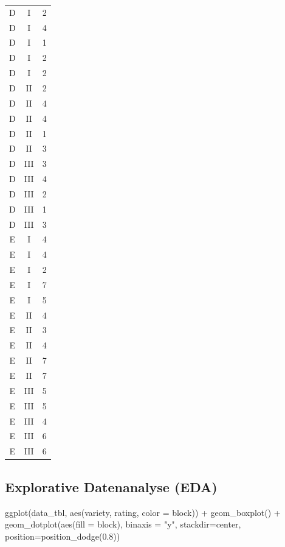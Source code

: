 \documentclass[
  letterpaper,
]{scrbook}
\newenvironment{Shaded}{\begin{snugshade}}{\end{snugshade}}
\newcommand{\AttributeTok}[1]{\textcolor[rgb]{0.40,0.45,0.13}{#1}}
\newcommand{\FloatTok}[1]{\textcolor[rgb]{0.68,0.00,0.00}{#1}}
\newcommand{\FunctionTok}[1]{\textcolor[rgb]{0.28,0.35,0.67}{#1}}
\newcommand{\NormalTok}[1]{\textcolor[rgb]{0.00,0.23,0.31}{#1}}
\newcommand{\SpecialCharTok}[1]{\textcolor[rgb]{0.37,0.37,0.37}{#1}}
\newcommand{\StringTok}[1]{\textcolor[rgb]{0.13,0.47,0.30}{#1}}
\begin{document}
\begin{longtable}[]{@{}ccc@{}}
D & I & 2 \\
D & I & 4 \\
D & I & 1 \\
D & I & 2 \\
D & I & 2 \\
D & II & 2 \\
D & II & 4 \\
D & II & 4 \\
D & II & 1 \\
D & II & 3 \\
D & III & 3 \\
D & III & 4 \\
D & III & 2 \\
D & III & 1 \\
D & III & 3 \\
E & I & 4 \\
E & I & 4 \\
E & I & 2 \\
E & I & 7 \\
E & I & 5 \\
E & II & 4 \\
E & II & 3 \\
E & II & 4 \\
E & II & 7 \\
E & II & 7 \\
E & III & 5 \\
E & III & 5 \\
E & III & 4 \\
E & III & 6 \\
E & III & 6 \\
\bottomrule()
\end{longtable}

\hypertarget{explorative-datenanalyse-eda-1}{%
\subsection{Explorative Datenanalyse
(EDA)}\label{explorative-datenanalyse-eda-1}}

\begin{Shaded}
\begin{Highlighting}[]
\FunctionTok{ggplot}\NormalTok{(data\_tbl, }\FunctionTok{aes}\NormalTok{(variety, rating, }\AttributeTok{color =}\NormalTok{ block)) }\SpecialCharTok{+}
  \FunctionTok{geom\_boxplot}\NormalTok{() }\SpecialCharTok{+}
  \FunctionTok{geom\_dotplot}\NormalTok{(}\FunctionTok{aes}\NormalTok{(}\AttributeTok{fill =}\NormalTok{ block), }\AttributeTok{binaxis =} \StringTok{"y"}\NormalTok{, }\AttributeTok{stackdir=}\StringTok{\textquotesingle{}center\textquotesingle{}}\NormalTok{, }
               \AttributeTok{position=}\FunctionTok{position\_dodge}\NormalTok{(}\FloatTok{0.8}\NormalTok{))  }
\end{Highlighting}
\end{Shaded}
\end{document}
